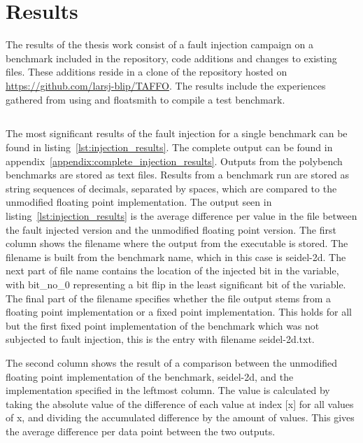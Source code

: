 \section{Results}

The results of the thesis work consist of a fault injection campaign on a benchmark included in the \taffo{} repository, code additions and changes to existing files. These additions reside in a clone of the \taffo{} repository hosted on \href{https://github.com/larsj-blip/TAFFO}{https://github.com/larsj-blip/TAFFO}. The results include the experiences gathered from using \taffo{} and floatsmith to compile a test benchmark.


\subsection{\Taffo{}}
The most significant results of the fault injection for a single benchmark can be found in listing~\ref{lst:injection_results}. The complete output can be found in appendix~\ref{appendix:complete_injection_results}. Outputs from the polybench benchmarks are stored as text files. Results from a benchmark run are stored as string sequences of decimals, separated by spaces, which are compared to the unmodified floating point implementation. The output seen in listing~\ref{lst:injection_results} is the average difference per value in the file between the fault injected version and the unmodified floating point version.   
The first column shows the filename where the output from the executable is stored. The filename is built from the benchmark name, which in this case is seidel-2d. The next part of file name contains the location of the injected bit in the variable, with bit\_no\_0 representing a bit flip in the least significant bit of the variable. The final part of the filename specifies whether the file output stems from a floating point implementation or a fixed point implementation.  This holds for all but the first fixed point implementation of the benchmark which was not subjected to fault injection, this is the entry with filename seidel-2d.txt.

The second column shows the result of a comparison between the unmodified floating point implementation of the benchmark, seidel-2d, and the implementation specified in the leftmost column. The value is calculated by taking the absolute value of the difference of each value at index [x] for all values of x, and dividing the accumulated difference by the amount of values. This gives the average difference per data point between the two outputs.

